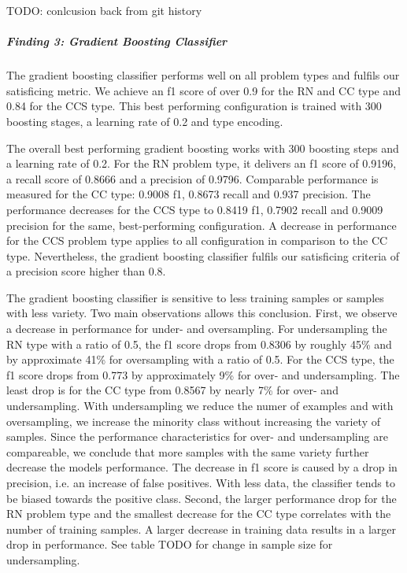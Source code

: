TODO: conlcusion back from git history

\subparagraph{Finding 3: Gradient Boosting Classifier}
The gradient boosting classifier performs well on all problem types and fulfils our satisficing  metric. We achieve an f1 score of over 0.9 for the RN and CC type and 0.84 for the CCS type. This best performing configuration is trained with 300 boosting stages, a learning rate of 0.2 and type encoding.

The overall best performing gradient boosting works with 300 boosting steps and a learning rate of 0.2. For the RN problem type, it delivers an f1 score of 0.9196, a recall score of 0.8666 and a precision of 0.9796. Comparable performance is measured for the CC type: 0.9008 f1, 0.8673 recall and 0.937 precision. The performance decreases for the CCS type to 0.8419 f1, 0.7902 recall and 0.9009 precision for the same, best-performing configuration. A decrease in performance for the CCS problem type applies to all configuration in comparison to the CC type. Nevertheless, the gradient boosting classifier fulfils our satisficing criteria of a precision score higher than 0.8.

The gradient boosting classifier is sensitive to less training samples or samples with less variety. Two main observations allows this conclusion. First, we observe a decrease in performance for under- and oversampling. For undersampling the RN type with a ratio of 0.5, the f1 score drops from 0.8306 by roughly 45\% and by approximate 41\% for oversampling with a ratio of 0.5. For the CCS type, the f1 score drops from 0.773 by approximately 9\% for over- and undersampling. The least drop is for the CC type from 0.8567 by nearly 7\% for over- and undersampling. With undersampling we reduce the numer of examples and with oversampling, we increase the minority class without increasing the variety of samples. Since the performance characteristics for over- and undersampling are compareable, we conclude that more samples with the same variety further decrease the models performance. The decrease in f1 score is caused by a drop in precision, i.e. an increase of false positives. With less data, the classifier tends to be biased towards the positive class.
Second, the larger performance drop for the RN problem type and the smallest decrease for the CC type correlates with the number of training samples. A larger decrease in training data results in a larger drop in performance. See table TODO for change in sample size for undersampling. 

